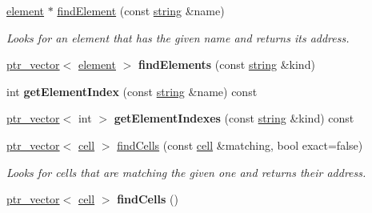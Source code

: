 \begin{DoxyCompactItemize}
\item 
\hypertarget{classmbdev__ontology_1_1ontology_a9dae61dce79833a83c7361b72f435c44}{\hyperlink{classmbdev__ontology_1_1element}{element} $\ast$ \hyperlink{classmbdev__ontology_1_1ontology_a9dae61dce79833a83c7361b72f435c44}{find\-Element} (const \hyperlink{classmbdev_1_1string}{string} \&name)}\label{classmbdev__ontology_1_1ontology_a9dae61dce79833a83c7361b72f435c44}

\begin{DoxyCompactList}\small\item\em \-Looks for an element that has the given name and returns its address. \end{DoxyCompactList}\item 
\hypertarget{classmbdev__ontology_1_1ontology_a612e5dd67fcac3a09b1a706afd109302}{\hyperlink{classmbdev_1_1ptr__vector}{ptr\-\_\-vector}$<$ \hyperlink{classmbdev__ontology_1_1element}{element} $>$ {\bfseries find\-Elements} (const \hyperlink{classmbdev_1_1string}{string} \&kind)}\label{classmbdev__ontology_1_1ontology_a612e5dd67fcac3a09b1a706afd109302}

\item 
\hypertarget{classmbdev__ontology_1_1ontology_a9954a0577b6954559a30de87ca9e87cd}{int {\bfseries get\-Element\-Index} (const \hyperlink{classmbdev_1_1string}{string} \&name) const }\label{classmbdev__ontology_1_1ontology_a9954a0577b6954559a30de87ca9e87cd}

\item 
\hypertarget{classmbdev__ontology_1_1ontology_ae9844b5e7d13a76b8047da14d1111589}{\hyperlink{classmbdev_1_1ptr__vector}{ptr\-\_\-vector}$<$ int $>$ {\bfseries get\-Element\-Indexes} (const \hyperlink{classmbdev_1_1string}{string} \&kind) const }\label{classmbdev__ontology_1_1ontology_ae9844b5e7d13a76b8047da14d1111589}

\item 
\hypertarget{classmbdev__ontology_1_1ontology_a84485b7f8554e5998481f391c82fb758}{\hyperlink{classmbdev_1_1ptr__vector}{ptr\-\_\-vector}$<$ \hyperlink{classmbdev__ontology_1_1cell}{cell} $>$ \hyperlink{classmbdev__ontology_1_1ontology_a84485b7f8554e5998481f391c82fb758}{find\-Cells} (const \hyperlink{classmbdev__ontology_1_1cell}{cell} \&matching, bool exact=false)}\label{classmbdev__ontology_1_1ontology_a84485b7f8554e5998481f391c82fb758}

\begin{DoxyCompactList}\small\item\em \-Looks for cells that are matching the given one and returns their address. \end{DoxyCompactList}\item 
\hypertarget{classmbdev__ontology_1_1ontology_a5b9977beda0a587e56e34d9a94d8c937}{\hyperlink{classmbdev_1_1ptr__vector}{ptr\-\_\-vector}$<$ \hyperlink{classmbdev__ontology_1_1cell}{cell} $>$ {\bfseries find\-Cells} ()}\label{classmbdev__ontology_1_1ontology_a5b9977beda0a587e56e34d9a94d8c937}


\end{DoxyCompactItemize}
